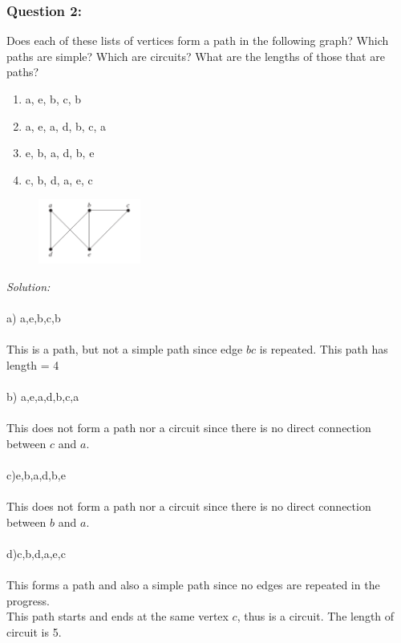 \documentclass[a4paper]{article}
\begin{document}
	\subsubsection*{Question 2:}
	Does each of these lists of vertices form a path in the following graph? Which paths are simple? Which are circuits? What are the lengths of those that are paths?
	\begin{enumerate}[label=\alph*)]
		\item a, e, b, c, b
		\item a, e, a, d, b, c, a
		\item e, b, a, d, b, e
		\item c, b, d, a, e, c
	\end{enumerate}
	\begin{figure}[H]
		\centering
		\includegraphics[width=0.3\textwidth]{tut92.png}
	\end{figure}
	\textit{Solution:}\\\\
	a) a,e,b,c,b\\\\
	This is a path, but not a simple path since edge $bc$ is repeated. This path has length = 4 \\\\
	b) a,e,a,d,b,c,a\\\\
	This does not form a path nor a circuit since there is no direct connection between $c$ and $a$.\\\\
	c)e,b,a,d,b,e\\\\
	This does not form a path nor a circuit since there is no direct connection between $b$ and $a$.\\\\
	d)c,b,d,a,e,c\\\\
	This forms a path and also a simple path since no edges are repeated in the progress.\\
	This path starts and ends at the same vertex $c$, thus is a circuit. The length of circuit is 5.
\end{document}
